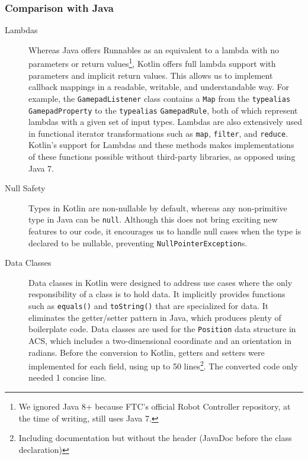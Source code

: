 \documentclass{article}
\begin{document}
\subsubsection{Comparison with Java}
\begin{description}

\item[Lambdas]
Whereas Java offers Runnables as an equivalent to a lambda with no parameters or return values\footnote{We ignored Java 8+ because FTC's official Robot Controller repository, at the time of writing, still uses Java 7.}, Kotlin offers full lambda support with parameters and implicit return values. This allows us to implement callback mappings in a readable, writable, and understandable way. For example, the \texttt{GamepadListener} class contains a \texttt{Map} from the \texttt{typealias} \texttt{GamepadProperty} to the \texttt{typealias} \texttt{GamepadRule}, both of which represent lambdas with a given set of input types. Lambdas are also extensively used in functional iterator transformations such as \texttt{map}, \texttt{filter}, and \texttt{reduce}. Kotlin's support for Lambdas and these methods makes implementations of these functions possible without third-party libraries, as opposed using Java 7.

\item[Null Safety]
Types in Kotlin are non-nullable by default, whereas any non-primitive type in Java can be \texttt{null}. Although this does not bring exciting new features to our code, it encourages us to handle null cases when the type is declared to be nullable, preventing \texttt{NullPointerException}s.

\item[Data Classes]
Data classes in Kotlin were designed to address use cases where the only responsibility of a class is to hold data. It implicitly provides functions such as \texttt{equals()} and \texttt{toString()} that are specialized for data. It eliminates the getter/setter pattern in Java, which produces plenty of boilerplate code. Data classes are used for the \texttt{Position} data structure in ACS, which includes a two-dimensional coordinate and an orientation in radians. Before the conversion to Kotlin, getters and setters were implemented for each field, using up to 50 lines\footnote{Including documentation but without the header (JavaDoc before the class declaration)}. The converted code only needed 1 concise line.

\end{description}
\end{document}
